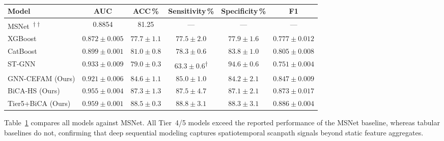 \begin{table}[t]
\centering
\small
\setlength{\tabcolsep}{5.5pt}
\caption{}
\label{tab:results}
\begin{tabular}{l c c c c c}
\toprule
\textbf{Model} & \textbf{AUC} & \textbf{ACC\,\%} & \textbf{Sensitivity\,\%} & \textbf{Specificity\,\%} & \textbf{F1} \\
\midrule
MSNet~\cite{song2025}\textsuperscript{$\dag\dag$}                     & 0.8854       & 81.25        & {---}                  & {---}           & {---}             \\
\midrule
XGBoost~\cite{chen2016xgboost}            & $0.872{\pm}0.005$ & $77.7{\pm}1.1$ & $77.5{\pm}2.0$    & $77.9{\pm}1.6$  & $0.777{\pm}0.012$ \\
CatBoost~\cite{prokhorenkova2018catboost} & $0.899{\pm}0.001$ & $81.0{\pm}0.8$ & $78.3{\pm}0.6$    & $83.8{\pm}1.0$  & $0.805{\pm}0.008$ \\
\midrule
ST-GNN                                    & $0.933{\pm}0.009$ & $79.0{\pm}0.3$ & $63.3{\pm}0.6$\textsuperscript{$\dag$} & $94.6{\pm}0.6$  & $0.751{\pm}0.004$ \\
GNN-CEFAM (Ours)                          & $0.921{\pm}0.006$ & $84.6{\pm}1.1$ & $85.0{\pm}1.0$    & $84.2{\pm}2.1$  & $0.847{\pm}0.009$ \\
\midrule
BiCA-HS (Ours)                            & $0.955{\pm}0.004$ & $87.3{\pm}1.3$ & $87.5{\pm}4.7$    & $87.1{\pm}2.1$  & $0.873{\pm}0.017$ \\
Tier5+BiCA (Ours)                         & $\mathbf{0.959{\pm}0.001}$ & $\mathbf{88.5{\pm}0.3}$ & $\mathbf{88.8{\pm}3.1}$ & $\mathbf{88.3{\pm}3.1}$ & $\mathbf{0.886{\pm}0.004}$ \\
\bottomrule
\end{tabular}
\end{table}

Table~\ref{tab:results} compares all models against MSNet. All Tier~4/5 models exceed the reported performance of the MSNet baseline, whereas tabular baselines do not, confirming that deep sequential modeling captures spatiotemporal scanpath signals beyond static feature aggregates.

